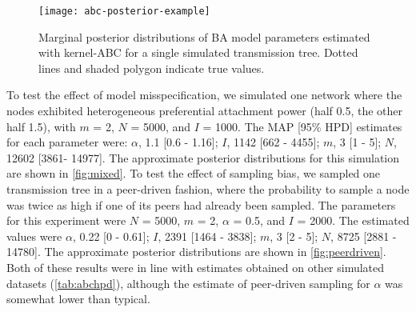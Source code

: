 \begin{figure}[ht]
    \centering
    \texttt{[image: abc-posterior-example]}
  \vspace{6pt}
  \caption{
    Marginal posterior distributions of BA model parameters estimated
    with kernel-ABC for a single simulated transmission tree. Dotted
    lines and shaded polygon indicate true values.
  }
  \label{fig:abcex}
\end{figure}



To test the effect of model misspecification, we simulated one network where
the nodes exhibited heterogeneous preferential attachment power (half 0.5, the
other half 1.5), with $m$ = 2, $N$ = 5000, and $I$ = 1000. The MAP [95\%
HPD] estimates for each parameter were: 
$\alpha$, 
  1.1 
  [0.6 -
   1.16];
$I$,
  1142 
  [662 -
   4455];
$m$,
  3 
  [1 -
   5];
$N$,
  12602 
  [3861-
   14977].
The approximate posterior distributions for this simulation are shown in
\cref{fig:mixed}. To test the effect of sampling bias, we sampled one
transmission tree in a peer-driven fashion, where the probability to sample a
node was twice as high if one of its peers had already been sampled. The
parameters for this experiment were $N$ = 5000, $m$ = 2, $\alpha$ = 0.5, and
$I$ = 2000. The estimated values were
$\alpha$, 
  0.22 
  [0 -
   0.61];
$I$,
  2391 
  [1464 -
   3838];
$m$,
  3 
  [2 -
   5];
$N$,
  8725 
  [2881 -
   14780].
The approximate posterior distributions are shown in \cref{fig:peerdriven}. Both
of these results were in line with estimates obtained on other simulated
datasets (\cref{tab:abchpd}), although the estimate of peer-driven sampling for
$\alpha$ was somewhat lower than typical.

